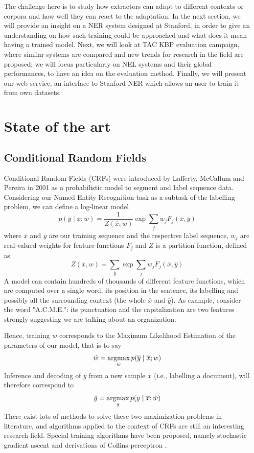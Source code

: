 \documentclass[a4paper,11pt]{report}
\newcommand{\argmax}{\operatornamewithlimits{argmax}}
\begin{document}
The challenge here is to study how extractors can adapt to different contexts or corpora and how well they can react to the adaptation. In the next section, we will provide an insight on a NER system designed at Stanford, in order to give an understanding on how such training could be approached and what does it mean having a trained model. Next, we will look at TAC KBP evaluation campaign, where similar systems are compared and new trends for research in the field are proposed; we will focus particularly on NEL systems and their global performances, to have an idea on the evaluation method. Finally, we will present our web service, an interface to Stanford NER which allows an user to train it from own datasets.

\chapter{State of the art}

\section{Conditional Random Fields}
\label{sec:crfs}
Conditional Random Fields (CRFs) were introduced by Lafferty, McCallum and Pereira in 2001\cite{lafferty2001conditional} as a probabilistic model to segment and label sequence data. Considering our Named Entity Recognition task as a subtask of the labelling problem, we can define a log-linear model
$$
p(\overline{y} \mid \overline{x}; w) = \frac{1}{Z(\overline{x}, w)}\exp\sum\limits_j w_jF_j(\overline{x}, \overline{y})
$$
where $\overline{x}$ and $\overline{y}$ are our training sequence and the respective label sequence, $w_j$ are real-valued weights for feature functions $F_j$ and $Z$ is a partition function, defined as
$$
Z(\overline{x}, w) = \sum\limits_{\overline{y}}\exp\sum\limits_j w_jF_j(\overline{x}, \overline{y})
$$
A model can contain hundreds of thousands of different feature functions, which are computed over a single word, its position in the sentence, its labelling and possibly all the surrounding context (the whole $\overline{x}$ and $\overline{y}$). As example, consider the word "A.C.M.E.": its punctuation and the capitalization are two features strongly suggesting we are talking about an organization.

Hence, training $w$ corresponds to the Maximum Likelihood Estimation of the parameters of our model, that is to say
$$
\hat{w} = \argmax_w p(\overline{y} \mid \overline{x}; w)
$$
Inference and decoding of $\overline{y}$ from a new sample $\overline{x}$ (i.e., labelling a document), will therefore correspond to
$$
\hat{y} = \argmax_y p(y \mid \overline{x}; \hat{w})
$$
There exist lots of methods to solve these two maximization problems in literature, and algorithms applied to the context of CRFs are still an interesting research field. Special training algorithms have been proposed, namely stochastic gradient ascent and derivations of Collins perceptron \cite{elkan2008log}.
\end{document}
